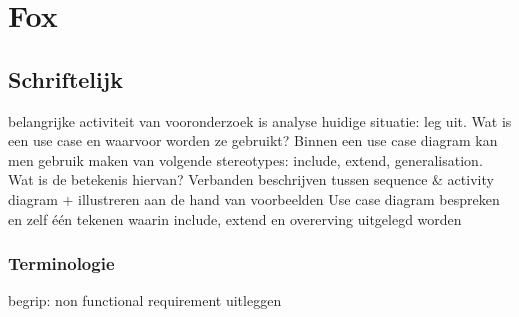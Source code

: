 \section{Fox}


\subsection{Schriftelijk}

\be
\itf belangrijke activiteit van vooronderzoek is analyse huidige situatie: leg uit.
\itf Wat is een use case en waarvoor worden ze gebruikt?
\itf Binnen een use case diagram kan men gebruik maken van volgende stereotypes: include, extend, generalisation. Wat is de betekenis hiervan?
\itf Verbanden beschrijven tussen sequence \& activity diagram + illustreren aan de hand van voorbeelden
\itf Use case diagram bespreken en zelf één tekenen waarin include, extend en overerving uitgelegd worden
\ee 

\subsubsection{Terminologie}

begrip: non functional requirement uitleggen

